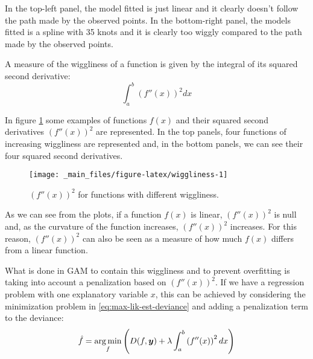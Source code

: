 \documentclass[a4paper, nobind]{templates/ociamthesis}
\theoremstyle{definition}
\theoremstyle{definition}
\theoremstyle{definition}
\theoremstyle{remark}
\begin{document}
In the top-left panel, the model fitted is just linear and it clearly doesn't follow the path made by the observed points. In the bottom-right panel, the models fitted is a spline with 35 knots and it is clearly too wiggly compared to the path made by the observed points.

A measure of the wiggliness of a function is given by the integral of its squared second derivative:
\begin{equation}
\label{eq:wiggliness}
\int_{a}^{b}{\left( f''(x) \right)^2 dx}
\end{equation}

In figure \ref{fig:wiggliness} some examples of functions \(f(x)\) and their squared second derivatives \(\left(f''(x)\right)^2\) are represented. In the top panels, four functions of increasing wiggliness are represented and, in the bottom panels, we can see their four squared second derivatives.



\begin{figure}[!hbtp]

{\centering \texttt{[image: \_main\_files/figure-latex/wiggliness-1]} 

}

\caption{\(\left(f''(x)\right)^2\) for functions with different wiggliness.}\label{fig:wiggliness}
\end{figure}

As we can see from the plots, if a function \(f(x)\) is linear, \(\left(f''(x)\right)^2\) is null and, as the curvature of the function increases, \(\left(f''(x)\right)^2\) increases. For this reason, \(\left(f''(x)\right)^2\) can also be seen as a measure of how much \(f(x)\) differs from a linear function.

What is done in GAM to contain this wiggliness and to prevent overfitting is taking into account a penalization based on \(\left(f''(x)\right)^2\). If we have a regression problem with one explanatory variable \(x\), this can be achieved by considering the minimization problem in \eqref{eq:max-lik-est-deviance} and adding a penalization term to the deviance:
\begin{equation}
\label{eq:gam-est-deviance}
\hat{f} = \operatorname*{arg\,min}_{f}{\left(D(f, \boldsymbol{y}) + \lambda \int_{a}^{b}{\left( f''(x) \right)^2 dx}\right)}
\end{equation}
\end{document}
